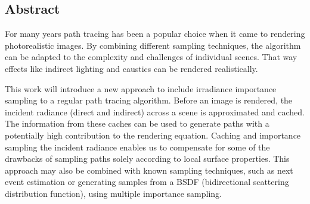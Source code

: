 \begin{center}
\begin{minipage}{0.7\textwidth}


\chapter*{Abstract}

For many years path tracing has been a popular choice when it came to rendering photorealistic images. By combining different sampling techniques, the algorithm can be adapted to the complexity and challenges of individual scenes. That way effects like indirect lighting and caustics can be rendered realistically.

This work will introduce a new approach to include irradiance importance sampling to a regular path tracing algorithm. Before an image is rendered, the incident radiance (direct and indirect) across a scene is approximated and cached. The information from these caches can be used to generate paths with a potentially high contribution to the rendering equation. \newline
Caching and importance sampling the incident radiance enables us to compensate for some of the drawbacks of sampling paths solely according to local surface properties. This approach may also be combined with known sampling techniques, such as next event estimation or generating samples from a BSDF (bidirectional scattering distribution function), using multiple importance sampling.


\end{minipage}
\end{center}

\blankpage

